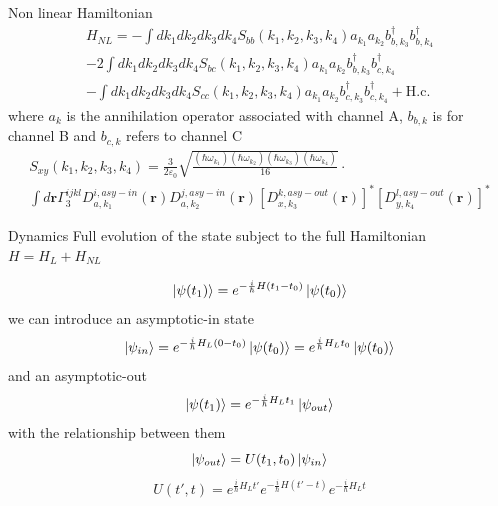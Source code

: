 \documentclass{beamer}
\renewcommand{\r}{\mathbf{r}}
\begin{document}
\begin{frame}[plain]{Non linear Hamiltonian}
\begin{multline}H_{NL} = -\int dk_1dk_2dk_3dk_4S_{bb}(k_1,k_2,k_3,k_4)a_{k_1}a_{k_2}b_{b,k_3}^\dagger b_{b,k_4}^\dagger \\-2\int dk_1dk_2dk_3dk_4S_{bc}(k_1,k_2,k_3,k_4)a_{k_1}a_{k_2}b_{b,k_3}^\dagger b_{c,k_4}^\dagger\\ -\int dk_1dk_2dk_3dk_4S_{cc}(k_1,k_2,k_3,k_4)a_{k_1}a_{k_2}b_{c,k_3}^\dagger b_{c,k_4}^\dagger +\text{H.c.}\end{multline}
where $a_k$ is the annihilation operator associated with channel A, $b_{b,k}$ is for channel B and $b_{c,k}$ refers to channel C 
\begin{multline}
S_{xy}(k_1,k_2,k_3,k_4) = \frac{3}{2\varepsilon_0}\sqrt{\frac{(\hbar\omega_{k_1})(\hbar\omega_{k_2})(\hbar\omega_{k_3})(\hbar\omega_{k_4})}{16}}\cdot \\ \int d\r \Gamma^{ijkl}_3D^{i,asy-in}_{a,k_1}(\r)D^{j,asy-in}_{a,k_2}(\r)\left[D^{k,asy-out}_{x,k_3}(\r)\right]^*\left[D^{l,asy-out}_{y,k_4}(\r)\right]^*
\end{multline}
\end{frame}

\begin{frame}[plain]{Dynamics}
Full evolution of the state subject to the full Hamiltonian $H = H_L + H_{NL}$

\begin{equation}\ket{\psi(t_1)} = e^{-\frac{i}{\hbar}H (t_1-t_0)}\ket{\psi(t_0)}\end{equation}
we can introduce an asymptotic-in state 
\begin{equation}\ket{\psi_{in}} = e^{-\frac{i}{\hbar}H_L (0-t_0)}\ket{\psi(t_0)} = e^{\frac{i}{\hbar}H_Lt_0}\ket{\psi(t_0)}\end{equation}
and an asymptotic-out 
\begin{equation}\ket{\psi(t_1)} = e^{-\frac{i}{\hbar}H_L t_1}\ket{\psi_{out}}\end{equation}
with the relationship between them
\begin{equation}\ket{\psi_{out}} = U(t_1,t_0)\ket{\psi_{in}}\end{equation}
\begin{equation}
U(t',t) = e^{\frac{i}{\hbar}H_Lt'}e^{-\frac{i}{\hbar}H(t'-t)}e^{-\frac{i}{\hbar}H_Lt}
\end{equation}
\end{frame}
\end{document}
